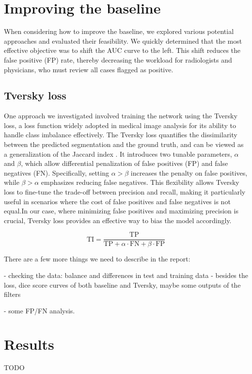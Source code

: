 \documentclass[conference]{IEEEtran}
\begin{document}
\section{Improving the baseline}

When considering how to improve the baseline, we explored various potential approaches and evaluated their feasibility. We quickly determined that the most effective objective was to shift the AUC curve to the left. This shift reduces the false positive (FP) rate, thereby decreasing the workload for radiologists and physicians, who must review all cases flagged as positive.

\subsection{Tversky loss}
One approach we investigated involved training the network using the Tversky loss, a loss function widely adopted in medical image analysis for its ability to handle class imbalance effectively. The Tversky loss quantifies the dissimilarity between the predicted segmentation and the ground truth, and can be viewed as a generalization of the Jaccard index \cite{b3}. It introduces two tunable parameters, $\alpha$ and $\beta$, which allow differential penalization of false positives (FP) and false negatives (FN). Specifically, setting $\alpha > \beta$ increases the penalty on false positives, while $\beta > \alpha$ emphasizes reducing false negatives. This flexibility allows Tversky loss to fine-tune the trade-off between precision and recall, making it particularly useful in scenarios where the cost of false positives and false negatives is not equal.In our case, where minimizing false positives and maximizing precision is crucial, Tversky loss provides an effective way to bias the model accordingly.

\[
\text{TI} = \frac{\text{TP}}{\text{TP} + \alpha \cdot \text{FN} + \beta \cdot \text{FP}}
\]










There are a few more things we need to describe in the report: 

- checking the data: balance and differences in test and training data
- besides the loss, dice score curves of both baseline and Tversky, maybe some outputs of the filters

- some FP/FN analysis.

\section{Results}
TODO
\end{document}
